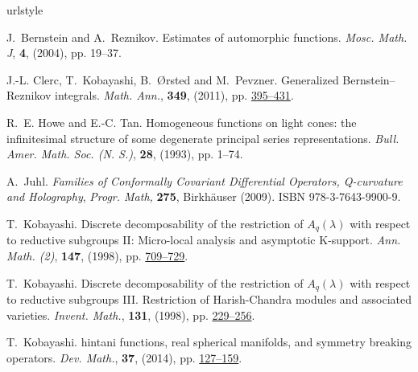 \documentclass[10pt]{article} %
\theoremstyle{definition}
\begin{document}
\begin{thebibliography}{14}
\expandafter\ifx\csname urlstyle\endcsname\relax
  \providecommand{\doi}[1]{doi:\discretionary{}{}{}#1}\else
  \providecommand{\doi}{doi:\discretionary{}{}{}\begingroup
  \urlstyle{rm}\Url}\fi

J.~Bernstein and A.~Reznikov.
\newblock Estimates of automorphic functions.
\newblock \emph{{\normalfont Mosc. Math. J}}, \textbf{\textbf{4}}, (2004),
  pp. 19--37.

J.-L. Clerc, T.~Kobayashi, B.~{\O}rsted and M.~Pevzner.
\newblock Generalized {B}ernstein--{R}eznikov integrals.
\newblock \emph{{\normalfont Math. Ann.}}, \textbf{349}, (2011), pp.
\href{http://dx.doi.org/10.1007/s00208-010-0516-4}{395--431}.

R.~E. Howe and E.-C. Tan.
\newblock Homogeneous functions on light cones: the infinitesimal structure of
  some degenerate principal series representations.
\newblock \emph{{\normalfont Bull. Amer. Math. Soc. (N. S.)}}, \textbf{28},
  (1993), pp. 1--74.

A.~Juhl.
\newblock \emph{Families of {C}onformally {C}ovariant {D}ifferential
  {O}perators, {Q}-curvature and {H}olography}, \emph{{\normalfont Progr.
  Math},} \textbf{275},
\newblock Birkh{\"a}user (2009).
\newblock ISBN 978-3-7643-9900-9.

T.~Kobayashi.
\newblock Discrete decomposability of the restriction of {$A_q(\lambda)$} with
  respect to reductive subgroups {II}: Micro-local analysis and asymptotic
  {K}-support.
  \newblock \emph{{\normalfont Ann. Math. (2)}}, \textbf{147}, (1998), pp. \href{http://dx.doi.org/10.2307/120963}{709--729}.

T.~Kobayashi.
\newblock Discrete decomposability of the restriction of {$A_q(\lambda)$} with
  respect to reductive subgroups {III}. {R}estriction of {H}arish-{C}handra
  modules and associated varieties.
\newblock \emph{{\normalfont Invent. Math.}}, \textbf{131}, (1998), pp.
\href{http://dx.doi.org/10.1007/s002220050203}{229--256}.

T.~Kobayashi.
hintani functions, real spherical manifolds, and
  symmetry breaking operators.
  \newblock \emph{{\normalfont Dev. Math.}}, \textbf{37}, (2014), pp. \href{http://dx.doi.org/10.4171/OWR/2014/3}{127--159}.


\end{thebibliography}
\end{document}
